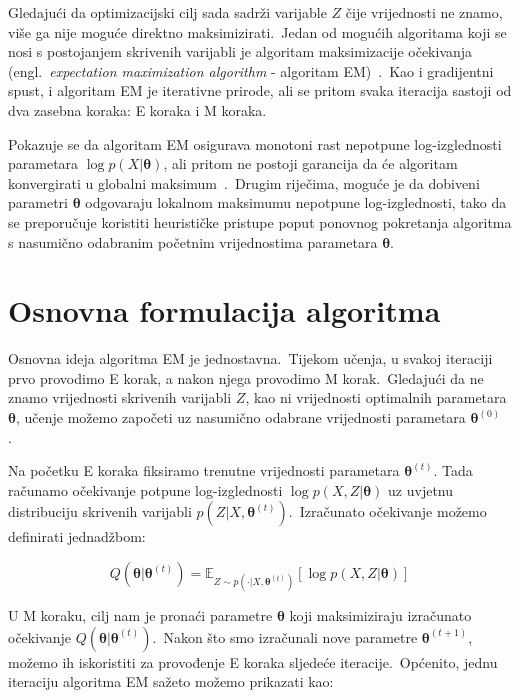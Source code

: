 \documentclass[diplomskirad]{fer}
\begin{document}
Gledajući da optimizacijski cilj sada sadrži varijable $Z$ čije vrijednosti ne znamo, više ga nije moguće direktno maksimizirati.\ 
Jedan od mogućih algoritama koji se nosi s postojanjem skrivenih varijabli je algoritam maksimizacije očekivanja (engl.\ \textit{expectation maximization algorithm} - algoritam EM)~\cite{moon1996expectation}.\ 
Kao i gradijentni spust, i algoritam EM je iterativne prirode, ali se pritom svaka iteracija sastoji od dva zasebna koraka: E koraka i M koraka.\ 
  
Pokazuje se da algoritam EM osigurava monotoni rast nepotpune log-izglednosti parametara $\log p(X | \bm{\theta})$, ali pritom ne postoji garancija da će algoritam konvergirati u globalni maksimum~\cite{wu1983convergence}.\
Drugim riječima, moguće je da dobiveni parametri $\bm{\theta}$ odgovaraju lokalnom maksimumu nepotpune log-izglednosti, tako da se preporučuje koristiti heurističke pristupe poput ponovnog pokretanja algoritma s nasumično odabranim početnim vrijednostima parametara $\bm{\theta}$.\ 

\section{Osnovna formulacija algoritma}
\label{sek:basic_em}

Osnovna ideja algoritma EM je jednostavna.\ Tijekom učenja, u svakoj iteraciji prvo provodimo E korak, a nakon njega provodimo M korak.\ 
Gledajući da ne znamo vrijednosti skrivenih varijabli $Z$, kao ni vrijednosti optimalnih parametara $\bm{\theta}$, učenje možemo započeti uz nasumično odabrane vrijednosti parametara $\bm{\theta}^{(0)}$.\ 
  
Na početku E koraka fiksiramo trenutne vrijednosti parametara $\bm{\theta}^{(t)}$. Tada računamo očekivanje potpune log-izglednosti $\log p(X, Z | \bm{\theta})$ uz uvjetnu distribuciju skrivenih varijabli $p(Z | X, \bm{\theta}^{(t)})$.\ 
Izračunato očekivanje možemo definirati jednadžbom:

\begin{equation}
  Q (\bm{\theta} | \bm{\theta}^{(t)}) = \mathbb{E}_{Z \sim p(\cdot | X, \bm{\theta}^{(t)})} \left[ \log p(X, Z | \bm{\theta}) \right]
  \label{eq:em_e_step_basic}
\end{equation}

U M koraku, cilj nam je pronaći parametre $\bm{\theta}$ koji maksimiziraju izračunato očekivanje $Q (\bm{\theta} | \bm{\theta}^{(t)})$.\
Nakon što smo izračunali nove parametre $\bm{\theta}^{(t + 1)}$, možemo ih iskoristiti za provođenje E koraka sljedeće iteracije.\ 
Općenito, jednu iteraciju algoritma EM sažeto možemo prikazati kao:
\end{document}

